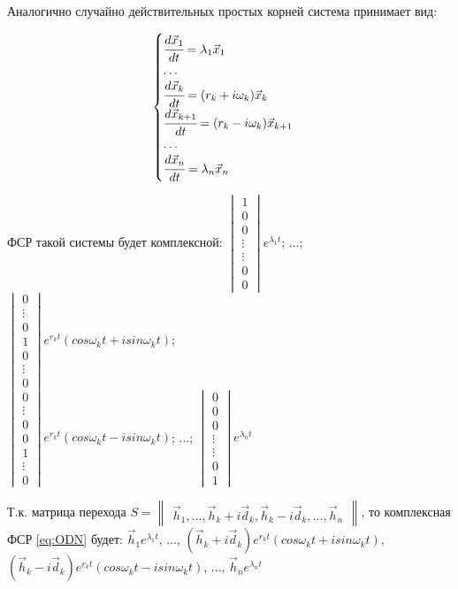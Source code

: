 Аналогично случайно действительных простых корней система принимает вид: 

\[ \begin{cases}
  \cfrac{d \vec{x}_1}{dt} = \lambda_1 \vec{x}_1 \\ 
  \ldots \\
  \cfrac{d \vec{x}_k}{dt} = (r_k + i \omega_k)\vec{x}_k \\
  \cfrac{d \vec{x}_{k+1}}{dt} = (r_k - i \omega_k)\vec{x}_{k+1} \\
  \ldots \\
  \cfrac{d \vec{x}_n}{dt} = \lambda_n \vec{x}_n
\end{cases}\]

ФСР такой системы будет комплексной: $\begin{vmatrix*} 1 \\ 0 \\ 0 \\ \vdots \\ \vdots \\ 0 \\ 0 \end{vmatrix*} e^{\lambda_1 t}$; ...; 
$\begin{vmatrix*} 0 \\ \vdots \\ 0 \\ 1 \\ 0 \\ \vdots \\ 0 \end{vmatrix*} e^{r_k t} (cos \omega_k t + i sin \omega_k t)$; \\
$\begin{vmatrix*} 0 \\ \vdots \\ 0 \\ 0 \\ 1 \\ \vdots \\ 0 \end{vmatrix*} e^{r_k t} (cos \omega_k t - i sin \omega_k t)$; ...; 
$\begin{vmatrix*} 0 \\ 0 \\ 0 \\ \vdots \\ \vdots \\ 0 \\ 1 \end{vmatrix*} e^{\lambda_n t}$

Т.к. матрица перехода $S = \begin{Vmatrix*} \vec{h}_1, \ldots, \vec{h}_k + i \vec{d}_k, \vec{h}_k - i \vec{d}_k, \ldots, \vec{h}_n \end{Vmatrix*}$, 
то комплексная ФСР \eqref{eq:ODN} будет: $\vec{h}_1 e^{\lambda_1 t}$, ..., $(\vec{h}_k + i \vec{d}_k) e^{r_k t} (cos\omega_k t + i sin \omega_k t)$, 
$(\vec{h}_k - i \vec{d}_k) e^{r_k t} (cos\omega_k t - i sin \omega_k t)$, ..., $\vec{h}_n e^{\lambda_n t}$  

